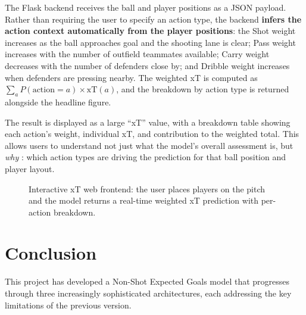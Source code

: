 \documentclass{article}
\begin{document}
The Flask backend receives the ball and player positions as a JSON payload. Rather than requiring the user to specify an action type, the backend \textbf{infers the action context automatically from the player positions}: the Shot weight increases as the ball approaches goal and the shooting lane is clear; Pass weight increases with the number of outfield teammates available; Carry weight decreases with the number of defenders close by; and Dribble weight increases when defenders are pressing nearby. The weighted xT is computed as $\sum_a P(\text{action}=a) \times \text{xT}(a)$, and the breakdown by action type is returned alongside the headline figure.

The result is displayed as a large ``xT'' value, with a breakdown table showing each action's weight, individual xT, and contribution to the weighted total. This allows users to understand not just what the model's overall assessment is, but \textit{why} : which action types are driving the prediction for that ball position and player layout.

\begin{figure}[h]
    \centering
    \caption{Interactive xT web frontend: the user places players on the pitch and
             the model returns a real-time weighted xT prediction with per-action breakdown.}
\end{figure}

\section{Conclusion}\label{sec:conclusion}

This project has developed a Non-Shot Expected Goals model that progresses through three increasingly sophisticated architectures, each addressing the key limitations of the previous version.
\end{document}
